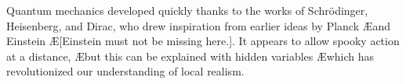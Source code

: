 \documentclass[11pt]{article}\usepackage[paperwidth=14cm,paperheight=7cm,left=1cm,right=3.6cm,top=1cm,bottom=1cm,marginparwidth=2.6cm,marginparsep=3mm]{geometry}\pagestyle{empty}
\begin{document}
Quantum mechanics developed quickly thanks to the works of Schr\"odinger, Heisenberg, and Dirac, who drew inspiration from earlier ideas by Planck \AE{and Einstein} \AE[Einstein must not be missing here.]. It appears to allow spooky action at a distance, \AE*{but this can be explained with hidden variables} \AE{which has revolutionized our understanding of local realism.}
\end{document}
